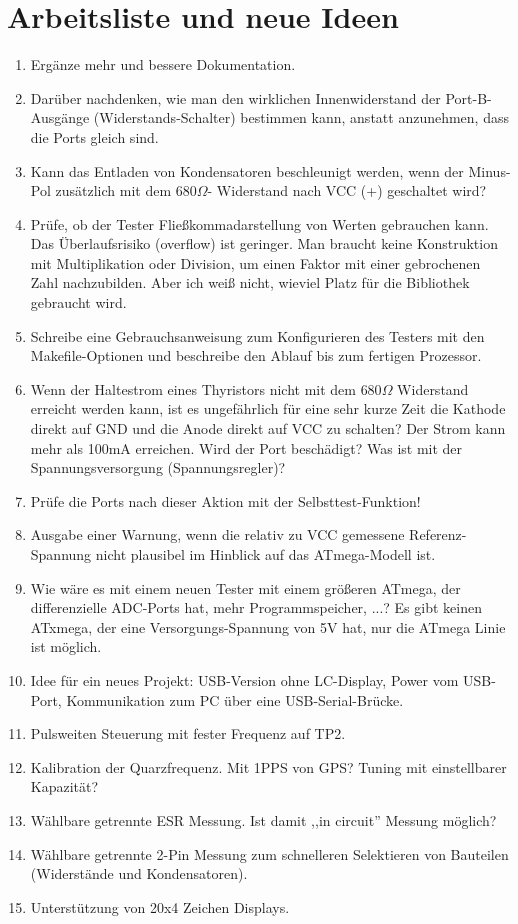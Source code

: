 
\chapter{Arbeitsliste und neue Ideen}
\label{sec:todo}

\begin{enumerate}
\item Ergänze mehr und bessere Dokumentation.
\item Darüber nachdenken, wie man den wirklichen Innenwiderstand der Port-B-Aus\-gän\-ge (Wider\-stands-Schal\-ter) bestimmen kann,
anstatt anzunehmen, dass die Ports gleich sind.
\item Kann das Entladen von Kondensatoren beschleunigt werden, wenn der Minus-Pol zusätzlich mit dem \(680\Omega\)-
Widerstand nach VCC (+) geschaltet wird?
\item Prüfe, ob der Tester Fließkommadarstellung von Werten gebrauchen kann.
Das Überlaufsrisiko (overflow) ist geringer.
Man braucht keine Konstruktion mit Multiplikation oder Division, um einen Faktor mit einer gebrochenen Zahl nachzubilden.
Aber ich weiß nicht, wieviel Platz für die Bibliothek gebraucht wird.
\item Schreibe eine Gebrauchsanweisung zum Konfigurieren des Testers mit den Makefile-Optionen und beschreibe
den Ablauf bis zum fertigen Prozessor.
\item Wenn der Haltestrom eines Thyristors nicht mit dem \(680\Omega\) Widerstand erreicht werden kann, 
ist es ungefährlich für eine sehr kurze Zeit die Kathode direkt auf GND und die Anode direkt auf VCC zu schalten?
Der Strom kann mehr als 100mA erreichen. Wird der Port beschädigt? Was ist mit der Spannungsversorgung (Spannungsregler)?
\item Prüfe die Ports nach dieser Aktion mit der Selbsttest-Funktion!
\item Ausgabe einer Warnung, wenn die relativ zu VCC gemessene Referenz-Spannung nicht plausibel im Hinblick auf das ATmega-Modell ist.
\item Wie wäre es mit einem neuen Tester mit einem größeren ATmega, der differenzielle ADC-Ports hat,
mehr Programmspeicher, ...?
Es gibt keinen ATxmega, der eine Versorgungs-Spannung von 5V hat, nur die ATmega Linie ist möglich.
\item Idee für ein neues Projekt: USB-Version ohne LC-Display, Power vom USB-Port, Kommunikation zum PC über eine USB-Serial-Brücke.
\item Pulsweiten Steuerung mit fester Frequenz auf TP2.
\item Kalibration der Quarzfrequenz. Mit 1PPS  von GPS? Tuning mit einstellbarer Kapazität?
\item Wählbare getrennte ESR Messung. Ist damit ,,in circuit'' Messung möglich?
\item Wählbare getrennte 2-Pin Messung zum schnelleren Selektieren von Bauteilen (Widerstände und Kondensatoren).
\item Unterstützung von 20x4 Zeichen Displays.
\end{enumerate}
